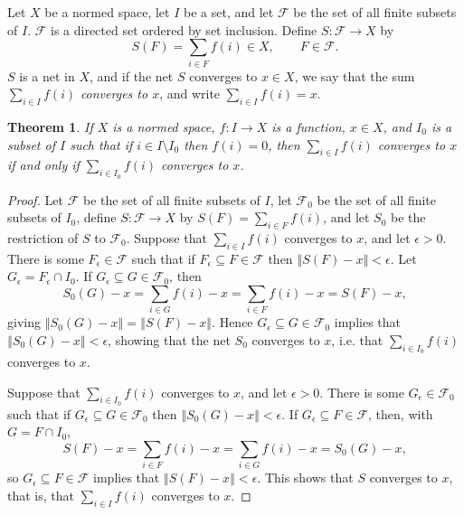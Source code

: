 \documentclass{article}
\newcommand{\norm}[1]{\left\Vert #1 \right\Vert}
\newtheorem{theorem}{Theorem}
\begin{document}
Let $X$ be a normed space, let $I$ be a set, and let $\mathscr{F}$ be the set of all finite subsets of $I$. $\mathscr{F}$ is a directed set ordered by set inclusion.
Define $S:\mathscr{F} \to X$ by
\[
S(F) = \sum_{i \in F} f(i) \in X, \qquad F \in \mathscr{F}.
\]
$S$ is a net in $X$, and if the net $S$ converges to $x \in X$, we say that the sum $\sum_{i \in I} f(i)$ {\em converges to $x$},
and write $\sum_{i \in I} f(i)=x$.

\begin{theorem}
If $X$ is a normed space, $f:I \to X$ is a function, $x \in X$, and $I_0$ is a subset of $I$ such that if $i \in I \setminus I_0$ then $f(i)=0$,
then $\sum_{i \in I} f(i)$ converges to $x$ if and only if $\sum_{i \in I_0} f(i)$ converges to $x$.
\label{subsetsum}
\end{theorem}
\begin{proof}
Let $\mathscr{F}$ be the set of all finite subsets of $I$, let $\mathscr{F}_0$ be the set of all finite subsets of $I_0$, define
$S:\mathscr{F} \to X$ by $S(F)=\sum_{i \in F} f(i)$,
and let
$S_0$ be the restriction of $S$ to $\mathscr{F}_0$.
Suppose that $\sum_{i \in I} f(i)$ converges to $x$, and let $\epsilon>0$. There is some $F_\epsilon \in \mathscr{F}$
such that if $F_\epsilon \subseteq F \in \mathscr{F}$ then $\norm{S(F)-x}<\epsilon$. Let $G_\epsilon = F_\epsilon \cap I_0$. If
$G_\epsilon \subseteq G \in \mathscr{F}_0$, then
\[
S_0(G)-x = \sum_{i \in G} f(i) - x = \sum_{i \in F} f(i) - x=S(F)-x,
\]
giving $\norm{S_0(G)-x}=\norm{S(F)-x}$. Hence
 $G_\epsilon \subseteq G \in \mathscr{F}_0$ implies that $\norm{S_0(G)-x}<\epsilon$, showing that the net $S_0$ converges to $x$, i.e. that
$\sum_{i \in I_0} f(i)$ converges to $x$.

Suppose that $\sum_{i \in I_0} f(i)$ converges to $x$, and let $\epsilon>0$. There is some $G_\epsilon \in \mathscr{F}_0$ such that
if $G_\epsilon \subseteq G \in \mathscr{F}_0$ then $\norm{S_0(G)-x}<\epsilon$. If $G_\epsilon \subseteq F \in \mathscr{F}$, then,
with $G = F \cap I_0$,
\[
S(F)-x = \sum_{i \in F} f(i) - x = \sum_{i \in G} f(i) - x = S_0(G)-x,
\]
so $G_\epsilon \subseteq F \in \mathscr{F}$ implies that $\norm{S(F)-x}<\epsilon$. This shows that $S$ converges to $x$, that is,
that $\sum_{i \in I} f(i)$ converges to $x$.
\end{proof}
\end{document}
